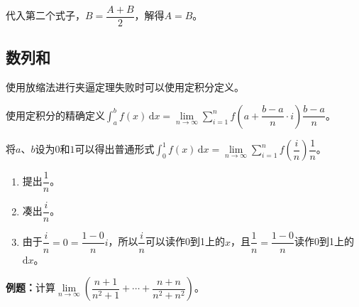 代入第二个式子，$B=\dfrac{A+B}{2}$，解得$A=B$。

\subsection{数列和}

使用放缩法进行夹逼定理失败时可以使用定积分定义。

使用定积分的精确定义$\displaystyle\int_a^bf(x)\,\textrm{d}x=\lim\limits_{n\to\infty}\sum\limits_{i=1}^nf\left(a+\dfrac{b-a}{n}\cdot i\right)\dfrac{b-a}{n}$。

将$a$、$b$设为$0$和$1$可以得出普通形式$\displaystyle\int_0^1f(x)\,\textrm{d}x=\lim\limits_{n\to\infty}\sum\limits_{i=1}^nf\left(\dfrac{i}{n}\right)\dfrac{1}{n}$。

\begin{enumerate}
    \item 提出$\dfrac{1}{n}$。
    \item 凑出$\dfrac{i}{n}$。
    \item 由于$\dfrac{i}{n}=0=\dfrac{1-0}{n}i$，所以$\dfrac{i}{n}$可以读作0到1上的$x$，且$\dfrac{1}{n}=\dfrac{1-0}{n}$读作0到1上的$\textrm{d}x$。
\end{enumerate}

\textbf{例题：}计算$\lim\limits_{n\to\infty}\left(\dfrac{n+1}{n^2+1}+\cdots+\dfrac{n+n}{n^2+n^2}\right)$。

